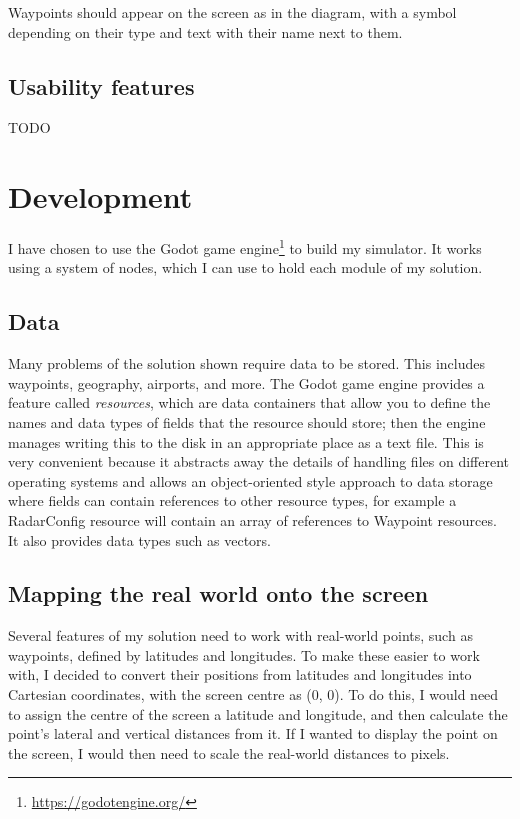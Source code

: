 \documentclass{article}
\begin{document}
Waypoints should appear on the screen as in the diagram, with a symbol depending on their type and text with their name next to them.


\subsection{Usability features}
TODO


\clearpage
\section{Development}
I have chosen to use the Godot game engine\footnote{\url{https://godotengine.org/}} to build my simulator.
It works using a system of nodes, which I can use to hold each module of my solution.


\subsection{Data}
Many problems of the solution shown require data to be stored.
This includes waypoints, geography, airports, and more.
The Godot game engine provides a feature called \textit{resources}, which are data containers that allow you to define the names and data types of fields that the resource should store; then the engine manages writing this to the disk in an appropriate place as a text file.
This is very convenient because it abstracts away the details of handling files on different operating systems and allows an object-oriented style approach to data storage where fields can contain references to other resource types, for example a RadarConfig resource will contain an array of references to Waypoint resources.
It also provides data types such as vectors.


\subsection{Mapping the real world onto the screen}
Several features of my solution need to work with real-world points, such as \glspl{waypoint}, defined by latitudes and longitudes.
To make these easier to work with, I decided to convert their positions from latitudes and longitudes into Cartesian coordinates, with the screen centre as (0, 0).
To do this, I would need to assign the centre of the screen a latitude and longitude, and then calculate the point's lateral and vertical distances from it.
If I wanted to display the point on the screen, I would then need to scale the real-world distances to pixels.
\end{document}
